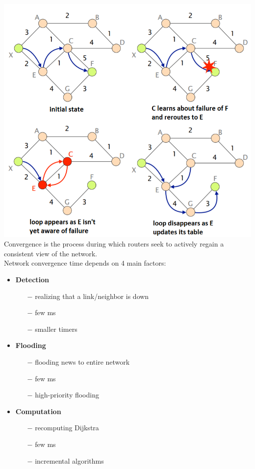 \documentclass[a4paper, fontsize=8pt, landscape, DIV=1]{scrartcl}
\begin{document}
\begin{multicols*}{4}
		\includegraphics[width=\columnwidth]{images/Network_Layer/transient_loop.png} 
		Convergence is the process during which routers seek to actively regain a
		consistent view of the network.\\
		Network convergence time depends on 4 main factors:
		\begin{itemize}[noitemsep]
			\item \textbf{Detection}
			\begin{itemize}
				\item[$-$] realizing that a link/neighbor is down
				\item[$-$] few ms
				\item[$-$] smaller timers
			\end{itemize} 
			\item \textbf{Flooding}
			\begin{itemize}
				\item[$-$] flooding news to entire network
				\item[$-$] few ms
				\item[$-$] high-priority flooding
			\end{itemize}  
			\item \textbf{Computation}
			\begin{itemize}
				\item[$-$] recomputing Dijkstra
				\item[$-$] few ms
				\item[$-$] incremental algorithms

\end{itemize}
\end{itemize}
\end{multicols*}
\end{document}
